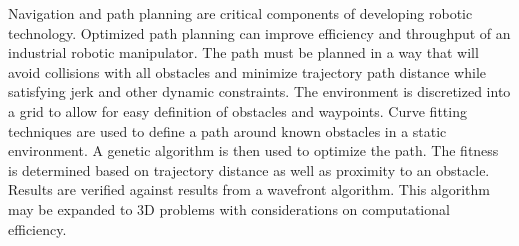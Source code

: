 Navigation and path planning are critical components of developing robotic technology. Optimized path planning can improve efficiency and throughput of an industrial robotic manipulator. The path must be planned in a way that will avoid collisions with all obstacles and minimize trajectory path distance while satisfying jerk and other dynamic constraints. The environment is discretized into a grid to allow for easy definition of obstacles and waypoints. Curve fitting techniques are used to define a path around known obstacles in a static environment. A genetic algorithm is then used to optimize the path. The fitness is determined based on trajectory distance as well as proximity to an obstacle. Results are verified against results from a wavefront algorithm. This algorithm may be expanded to 3D problems with considerations on computational efficiency.